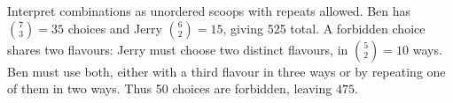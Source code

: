 Interpret combinations as unordered scoops with repeats allowed. Ben has $\binom73=35$ choices and Jerry $\binom62=15$, giving 525 total. A forbidden choice shares two flavours: Jerry must choose two distinct flavours, in $\binom52=10$ ways. Ben must use both, either with a third flavour in three ways or by repeating one of them in two ways. Thus 50 choices are forbidden, leaving $\boxed{475}$.
